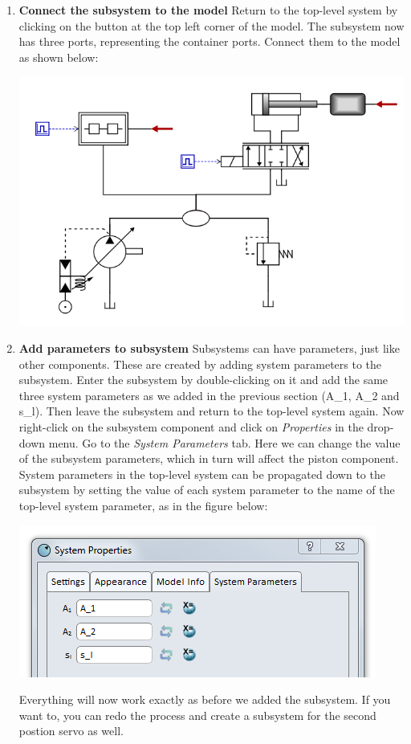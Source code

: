 \documentclass[a4paper,pdftex]{article}
\begin{document}
\begin{enumerate}
\item\textbf{Connect the subsystem to the model}
Return to the top-level system by clicking on the button at the top left corner of the model. The subsystem now has three ports, representing the container ports. Connect them to the model as shown below:

\includegraphics[width=0.8\linewidth]{gfx/advancedusage/connectedsubsystem.png}

\item\textbf{Add parameters to subsystem}
Subsystems can have parameters, just like other components. These are created by adding system parameters to the subsystem. Enter the subsystem by double-clicking on it and add the same three system parameters as we added in the previous section (A\_1, A\_2 and s\_l). Then leave the subsystem and return to the top-level system again. Now right-click on the subsystem component and click on \textit{Properties} in the drop-down menu. Go to the \textit{System Parameters} tab. Here we can change the value of the subsystem parameters, which in turn will affect the piston component. System parameters in the top-level system can be propagated down to the subsystem by setting the value of each system parameter to the name of the top-level system parameter, as in the figure below:

\includegraphics[width=0.6\linewidth]{gfx/advancedusage/subsystemparameters.png}

Everything will now work exactly as before we added the subsystem. If you want to, you can redo the process and create a subsystem for the second postion servo as well.

\end{enumerate}
\end{document}
